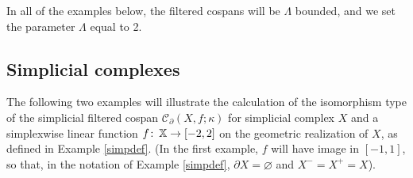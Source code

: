 \documentclass[11pt]{amsart}
\theoremstyle{definition}
\theoremstyle{remark}
\numberwithin{equation}{section}
\def\co{\colon\thinspace}
\begin{document}
In all of the examples below, the filtered cospans will be $\Lambda$ bounded, and we set the parameter $\Lambda$ equal to 2.

\subsection{Simplicial complexes}

The following two examples will illustrate the calculation of the isomorphism type of the simplicial filtered cospan $\mathcal{C}_{\partial}(X,f;\kappa)$ for simplicial complex $X$ and a simplexwise linear function $f\co \mathbb{X}\to [-2,2]$ on the geometric realization of $X$, as defined in Example \ref{simpdef}.  (In the first example, $f$ will have image in $[-1,1]$, so that, in the notation of Example \ref{simpdef}, $\partial X=\varnothing$ and $X^-=X^+=X$).
\end{document}
